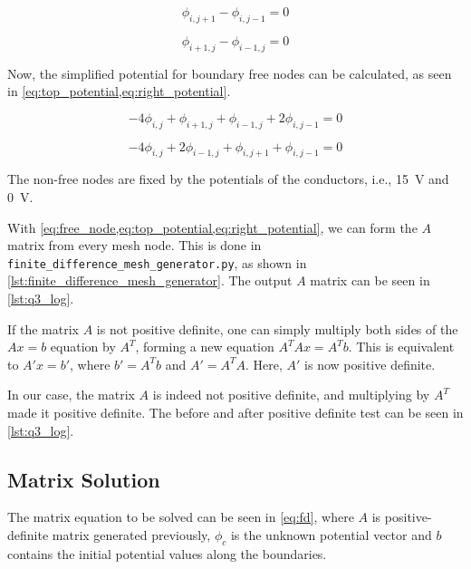 \documentclass[a4paper,titlepage]{article}
\begin{document}
	\begin{equation} \label{eq:neumann_top}
		\phi_{i, j + 1} - \phi_{i, j - 1} = 0
	\end{equation}
	
	\begin{equation} \label{eq:neumann_right}
		\phi_{i + 1, j} - \phi_{i - 1, j} = 0
	\end{equation}
	
	Now, the simplified potential for boundary free nodes can be calculated, as seen in \cref{eq:top_potential,eq:right_potential}.
	
	\begin{equation} \label{eq:top_potential}
		-4\phi_{i, j} + \phi_{i + 1, j}  + \phi_{i - 1, j}  + 2\phi_{i, j - 1} = 0
	\end{equation}
	
	\begin{equation} \label{eq:right_potential}
		-4\phi_{i, j} + 2\phi_{i - 1, j} + \phi_{i, j + 1}  + \phi_{i, j - 1} = 0
	\end{equation}
	
	The non-free nodes are fixed by the potentials of the conductors, i.e., \SI{15}{\volt} and \SI{0}{\volt}.
	
	With \cref{eq:free_node,eq:top_potential,eq:right_potential}, we can form the $A$ matrix from every mesh node. This is done in \texttt{finite_difference_mesh_generator.py}, as shown in \cref{lst:finite_difference_mesh_generator}. The output $A$ matrix can be seen in \cref{lst:q3_log}.
	
	If the matrix $A$ is not positive definite, one can simply multiply both sides of the $Ax = b$ equation by $A^T$, forming a new equation $A^TAx = A^Tb$. This is equivalent to $A'x = b'$, where $b' = A^Tb$ and $A' = A^TA$. Here, $A'$ is now positive definite.

	In our case, the matrix $A$ is indeed not positive definite, and multiplying by $A^T$ made it positive definite. The before and after positive definite test can be seen in \cref{lst:q3_log}.
	
	\subsection{Matrix Solution}
	
	The matrix equation to be solved can be seen in \cref{eq:fd}, where $A$ is positive-definite matrix generated previously, $\phi_c$ is the unknown potential vector and $b$ contains the initial potential values along the boundaries.
	
\end{document}
